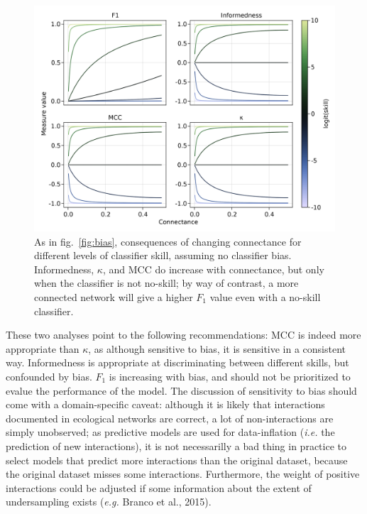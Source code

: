 \documentclass[11pt]{article}
\makeatletter
\def\maxwidth{\ifdim\Gin@nat@width>\linewidth\linewidth
\else\Gin@nat@width\fi}
\let\Oldincludegraphics\includegraphics
\renewcommand{\includegraphics}[1]{\Oldincludegraphics[width=\maxwidth]{#1}}
\makeatother
\begin{document}
\begin{figure}
\hypertarget{fig:connectance}{%
\centering
\includegraphics{figures/changing-connectance.png}
\caption{As in fig.~\ref{fig:bias}, consequences of changing connectance
for different levels of classifier skill, assuming no classifier bias.
Informedness, \(\kappa\), and MCC do increase with connectance, but only
when the classifier is not no-skill; by way of contrast, a more
connected network will give a higher \(F_1\) value even with a no-skill
classifier.}\label{fig:connectance}
}
\end{figure}

These two analyses point to the following recommendations: MCC is indeed
more appropriate than \(\kappa\), as although sensitive to bias, it is
sensitive in a consistent way. Informedness is appropriate at
discriminating between different skills, but confounded by bias. \(F_1\)
is increasing with bias, and should not be prioritized to evalue the
performance of the model. The discussion of sensitivity to bias should
come with a domain-specific caveat: although it is likely that
interactions documented in ecological networks are correct, a lot of
non-interactions are simply unobserved; as predictive models are used
for data-inflation (\emph{i.e.} the prediction of new interactions), it
is not necessarilly a bad thing in practice to select models that
predict more interactions than the original dataset, because the
original dataset misses some interactions. Furthermore, the weight of
positive interactions could be adjusted if some information about the
extent of undersampling exists (\emph{e.g.} Branco et al., 2015).
\end{document}
